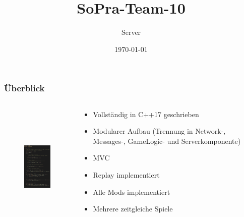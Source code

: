 \documentclass[aspectratio=169]{beamer}
\title{SoPra-Team-10}
\author{Server}
\date{\today}
\begin{document}
\maketitle

\begin{frame}
    \frametitle{Überblick}
    \begin{columns}
        \begin{column}{0.3\textwidth}
            \begin{center}
                \begin{figure}[H]
                    \includegraphics[height=6cm]{screenshot.png}
                \end{figure}
            \end{center}
        \end{column}
        \begin{column}{0.7\textwidth}
            \begin{itemize}
                \item Vollständig in C++17 geschrieben
                    \pause
                \item Modularer Aufbau (Trennung in Network-, Messages-, GameLogic- und Serverkomponente)
                    \pause
                \item MVC
                    \pause
                \item Replay implementiert
                    \pause
                \item Alle Mods implementiert
                    \pause
                \item Mehrere zeitgleiche Spiele
            \end{itemize}
        \end{column}
    \end{columns}
\end{frame}
\end{document}
